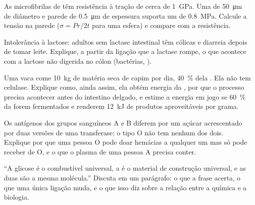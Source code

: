 \begin{exercise}[$\star\star$]\label{exo:b1:carbohydrates:8}
As microfibrilas de  têm resistência à tração de cerca de
\qty{1}{GPa}. Uma  de \qty{50}{\micro m} de diâmetro e parede de
\qty{0.5}{\micro m} de espessura suporta um  de \qty{0.8}{MPa}.
Calcule a tensão na parede ($\sigma = Pr/2t$ para uma esfera) e compare
com a resistência.
\end{exercise}

\begin{exercise}[$\star\star$]\label{exo:b1:carbohydrates:9}
Intolerância à lactose: adultos sem lactase intestinal têm cólicas e
diarreia depois de tomar leite. Explique, a partir da ligação que a
lactase rompe, o que acontece com a lactose não digerida no cólon
(bactérias, ).
\end{exercise}

\begin{exercise}[$\star\star\star$]\label{exo:b1:carbohydrates:10}
Uma vaca come \qty{10}{kg} de matéria seca de capim por dia,
\qty{40}{\%} dela . Ela não tem celulase. Explique como, ainda
assim, ela obtém energia da , por que o processo precisa
acontecer antes do intestino delgado, e estime a energia em jogo se
\qty{60}{\%} da  forem fermentados e renderem \qty{12}{kJ} de
produtos aproveitáveis por grama.
\end{exercise}

\begin{exercise}[$\star\star\star$]\label{exo:b1:carbohydrates:11}
Os antígenos dos grupos sanguíneos A e B diferem por um açúcar
acrescentado por duas versões de uma transferase; o tipo O não tem
nenhum dos dois. Explique por que uma pessoa O pode doar hemácias a
qualquer um mas só pode receber de O, e o que o plasma de uma pessoa A
precisa conter.
\end{exercise}

\begin{exercise}[$\star\star\star$]\label{exo:b1:carbohydrates:12}
``A glicose é o combustível universal, a  é o material de
construção universal, e as duas são a mesma molécula.'' Discuta em um
parágrafo: o que a frase acerta, o que uma única ligação muda, e o que
isso diz sobre a relação entre a química e a biologia.
\end{exercise}


